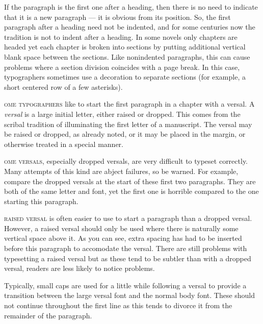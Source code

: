 \documentclass[10pt,letterpaper,extrafontsizes]{memoir}
\begin{document}
    If the paragraph is the first one after a heading, 
then there
is no need to indicate that it is a new paragraph --- it is obvious from its
position. So, the first paragraph after a heading 
need not be indented, and for some centuries now 
the tradition is not to indent after a heading.
In some novels only chapters are headed yet each chapter is broken into
sections by putting additional vertical blank space between the sections.
Like nonindented paragraphs, 
this can cause problems where a section division
coincides with a page break. In this case, typographers sometimes use a
decoration to separate sections (for example, a short centered row of a few
asterisks).
   


\textsc{ome typographers} 
like to start the first paragraph in a chapter
with a versal. A \emph{versal} is a large initial letter, either raised or
dropped. This comes from the scribal tradition of illuminating the first
letter of a manuscript. The versal may be raised or dropped, as already noted,
or it may be placed in the margin, or otherwise treated in 
a special manner.

\textsc{ome versals,} especially dropped versals, are very difficult
to typeset correctly. Many attempts of this kind are abject failures, so
be warned. For example, compare the dropped versals at the start of these
first two paragraphs. They are both of the same letter and font, yet the first
one is horrible compared to the one starting this paragraph.


\textsc{raised versal} is often easier to use to 
start a paragraph than a dropped versal. 
However, a raised versal should only be used
where there is naturally some vertical space above it. As you can see, extra
spacing has had to be inserted before this paragraph to accomodate the versal.
There are still problems with typesetting a raised versal but as these tend
to be subtler than with a dropped versal, readers are less likely
to notice problems.

Typically, small caps are used for a little while following a versal to 
provide a transition between the large versal font and the normal body font.
These should not continue throughout the first line as this tends to divorce
it from the remainder of the paragraph. 
\end{document}
